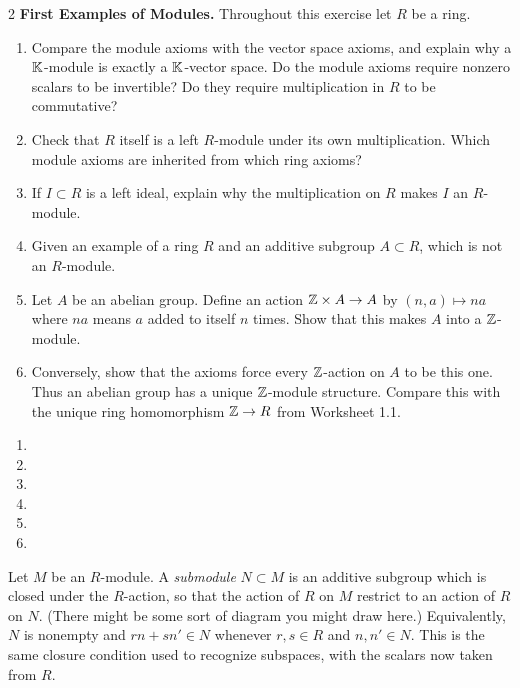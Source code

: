 \documentclass[Notebook.tex]{subfiles}
\begin{document}
\begin{problem}{2}\label{m:examples}
	\textbf{First Examples of Modules.} Throughout this exercise let $R$ be a ring.
	\begin{enumerate}[label=(\alph*),ref=\theenumi\alph*]
		\item Compare the module axioms with the vector space axioms, and explain why a $\mathbb K$-module is exactly a $\mathbb K$-vector space. Do the module axioms require nonzero scalars to be invertible? Do they require multiplication in $R$ to be commutative?
		\item Check that $R$ itself is a left $R$-module under its own multiplication. Which module axioms are inherited from which ring axioms?
		\item If $I\subset R$ is a left ideal, explain why the multiplication on $R$ makes $I$ an $R$-module.
		\item Given an example of a ring $R$ and an additive subgroup $A \subset R$, which is not an $R$-module.
		\item Let $A$ be an abelian group. Define an action $\mathbb Z\times A \to A$ by $(n,a) \mapsto na$ where $na$ means $a$ added to itself $n$ times. Show that this makes $A$ into a $\mathbb Z$-module.
		\item Conversely, show that the axioms force every $\mathbb Z$-action on $A$ to be this one. Thus an abelian group has a unique $\mathbb Z$-module structure. Compare this with the unique ring homomorphism $\mathbb Z\to R$ from Worksheet 1.1.
	\end{enumerate}
\end{problem}

\begin{solution}
	\bbni
	\begin{enumerate}[label=(\alph*),ref=\theenumi\alph*]
		\item
		\item
		\item
		\item
		\item
		\item
	\end{enumerate}
\end{solution}

\newpage

Let $M$ be an $R$-module. A \emph{submodule} $N\subset M$ is an additive subgroup which is closed under the $R$-action, so that the action of $R$ on $M$ restrict to an action of $R$ on $N$. (There might be some sort of diagram you might draw here.) Equivalently, $N$ is nonempty and $rn+sn'\in N$ whenever $r,s\in R$ and $n,n'\in N$. This is the same closure condition used to recognize subspaces, with the scalars now taken from $R$.
\end{document}
